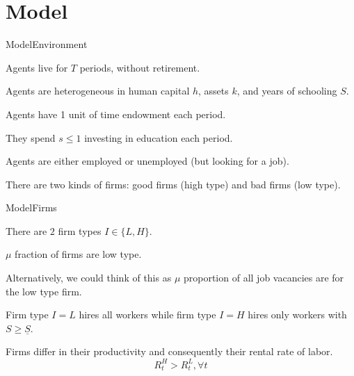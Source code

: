 \documentclass[notes, 10pt]{beamer}
\newenvironment{wideitemize}{\itemize\addtolength{\itemsep}{10pt}}{\enditemize}
\begin{document}
	\section{Model}
	\begin{frame}{Model}{Environment}
		\begin{wideitemize}
			\item Agents live for $ T $ periods, without retirement. 
			\item Agents are heterogeneous in human capital $ h $, assets $ k $, and years of schooling $S$. 
			\item Agents have 1 unit of time endowment each period.
			\item They spend $ s \leq 1$ investing in education each period.
			\item Agents are either employed or unemployed (but looking for a job).
			\item There are two kinds of firms: good firms (high type) and bad firms (low type).
		\end{wideitemize}
	\end{frame}

	\begin{frame}[c]{Model}{Firms}
		\begin{wideitemize}
			\item There are $2$ firm types $I \in \{L,H\}$.
			\item $ \mu $ fraction of firms are low type.
			\begin{wideitemize}
				\item  Alternatively, we could think of this as $\mu$ proportion of all job vacancies are for the low type firm.
			\end{wideitemize}
			\item Firm type $I=L$ hires all workers while firm type $I=H$ hires only workers with $S \geq \underline{S}$.
			\item Firms differ in their productivity and consequently their rental rate of labor.
					\[  R_t^H > R_t^L, \forall t  \]
		\end{wideitemize}
	\end{frame}
\end{document}
